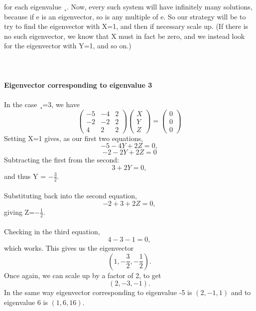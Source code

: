 \documentclass{book}
\begin{document}
for each eigenvalue ¸. Now, every such system will have infinitely many solutions, because if e is an eigenvector, so is any multiple of e. So our strategy will be to try to find the eigenvector with X=1, and then if necessary scale up. (If there is no such eigenvector, we know that X must in fact be zero, and we instead look for the eigenvector with Y=1, and so on.)
\\
\\
\\
\\
\textbf{Eigenvector corresponding to eigenvalue 3}\\ \\
In the case ¸=3, we have
\begin{equation*}
	\begin{pmatrix}
	-5 & -4 & 2\\
	-2 & -2 & 2\\
	4 & 2 & 2
	\end{pmatrix}
	\begin{pmatrix}
	X\\
	Y\\
	Z
	\end{pmatrix}  = 
	\begin{pmatrix}
	0\\
	0\\
	0
	\end{pmatrix}
\end{equation*}
Setting X=1 gives, as our first two equations,
\begin{equation*}
	-5 - 4Y + 2Z = 0,
\end{equation*}
\begin{equation*}
	-2 - 2Y + 2Z = 0
\end{equation*}
Subtracting the first from the second:
\begin{equation*}
	3 + 2Y = 0,
\end{equation*}
and thus Y = $-\frac{3}{2}$.
\\
\\
Substituting back into the second equation,
\begin{equation*}
	-2 + 3 + 2Z = 0,
\end{equation*}
giving Z=$-\frac{1}{2}$.
\\
\\
Checking in the third equation,
\begin{equation*}
	4 - 3 - 1 = 0,
\end{equation*}
which works. This gives us the eigenvector
\begin{equation*}
	(1, -\frac{3}{2}, -\frac{1}{2}).
\end{equation*}
Once again, we can scale up by a factor of 2, to get
\begin{equation*}
	(2, -3, -1).
\end{equation*}
In the same way eigenvector corresponding to eigenvalue -5 is $(2, -1, 1)$ and to eigenvalue 6 is $(1, 6, 16)$.
\end{document}
